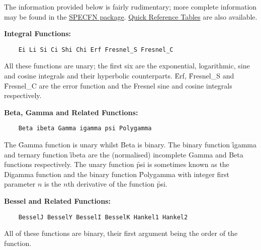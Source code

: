 The information provided below is fairly rudimentary; more complete
information may be found in the \hyperlink{SPECFNS}{SPECFN package}.
\hyperlink{SPECFNTAB1}{Quick Reference Tables} are also available.

\textbf{Integral Functions:}
\begin{verbatim}
    Ei Li Si Ci Shi Chi Erf Fresnel_S Fresnel_C
\end{verbatim}
All these functions are unary;
the first six are the exponential, logarithmic, sine and
cosine integrals and their hyperbolic counterparts. \f{Erf},
\f{Fresnel\_S} and \f{Fresnel\_C} are the error function and the Fresnel
sine and cosine integrals respectively.

\textbf{Beta, Gamma and Related Functions:}
\begin{verbatim}
    Beta ibeta Gamma igamma psi Polygamma
\end{verbatim}
The \f{Gamma} function is unary whilst \f{Beta} is binary.
The binary function \f{igamma} and ternary function \f{ibeta}
are the (normalised) incomplete Gamma and Beta functions respectively.
The unary function \f{psi} is sometimes known as the Digamma function and
the binary function \f{Polygamma} with integer first parameter $n$ is the
$n$th derivative of the function \f{psi}.

\textbf{Bessel and Related Functions:}
\begin{verbatim}
    BesselJ BesselY BesselI BesselK Hankel1 Hankel2
\end{verbatim}
All of these functions are binary, their first argument being the
order of the function.

